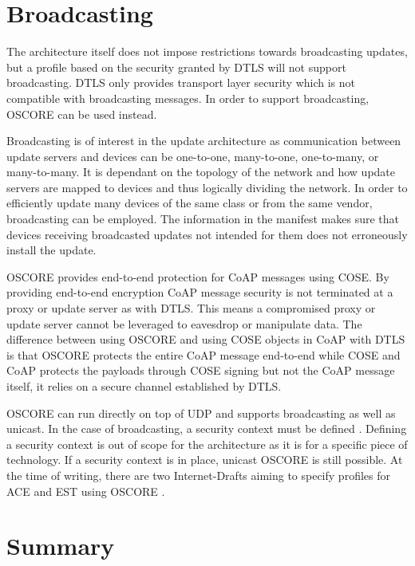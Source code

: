 \documentclass[0-thesis.tex]{subfiles}
\begin{document}
\section{Broadcasting}
\label{sec:broadcasting}
The architecture itself does not impose restrictions towards broadcasting updates, but a
profile based on the security granted by DTLS will not support broadcasting. DTLS only
provides transport layer security which is not compatible with broadcasting messages. In
order to support broadcasting, OSCORE can be used instead.

Broadcasting is of interest in the update architecture as communication between update
servers and devices can be one-to-one, many-to-one, one-to-many, or many-to-many. It is
dependant on the topology of the network and how update servers are mapped to devices and
thus logically dividing the network. In order to efficiently update many devices of the
same class or from the same vendor, broadcasting can be employed. The information in the
manifest makes sure that devices receiving broadcasted updates not intended for them does
not erroneously install the update.

OSCORE provides end-to-end protection for CoAP messages using COSE. By providing
end-to-end encryption CoAP message security is not terminated at a proxy or update server
as with DTLS. This means a compromised proxy or update server cannot be leveraged to
eavesdrop or manipulate data. The difference between using OSCORE and using COSE objects
in CoAP with DTLS is that OSCORE protects the entire CoAP message end-to-end while COSE
and CoAP protects the payloads through COSE signing but not the CoAP message itself, it
relies on a secure channel established by DTLS.

OSCORE can run directly on top of UDP and supports broadcasting as well as unicast. In the
case of broadcasting, a security context must be defined \parencite{oscore-group}.
Defining a security context is out of scope for the architecture as it is for a specific
piece of technology. If a security context is in place, unicast OSCORE is still possible.
At the time of writing, there are two Internet-Drafts aiming to specify profiles for ACE
and EST using OSCORE \parencite{ace-oscore, est-oscore}.

\section{Summary}
\end{document}
